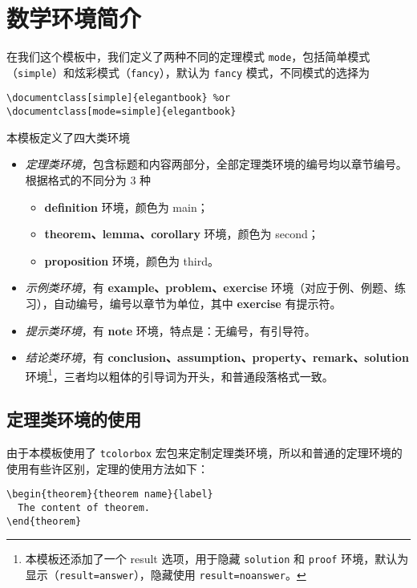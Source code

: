\documentclass[cn,10pt,math=newtx,citestyle=gb7714-2015,bibstyle=gb7714-2015]{elegantbook}
\begin{document}
\section{数学环境简介}

在我们这个模板中，我们定义了两种不同的定理模式 \lstinline{mode}，包括简单模式（\lstinline{simple}）和炫彩模式（\lstinline{fancy}），默认为 \lstinline{fancy} 模式，不同模式的选择为
\begin{lstlisting}
\documentclass[simple]{elegantbook} %or
\documentclass[mode=simple]{elegantbook}
\end{lstlisting}

本模板定义了四大类环境

\begin{itemize}
  \item \textit{定理类环境}，包含标题和内容两部分，全部定理类环境的编号均以章节编号。根据格式的不同分为 3 种
    \begin{itemize}
      \item \textcolor{main}{\textbf{definition}} 环境，颜色为 \textcolor{main}{main}；
      \item \textcolor{second}{\textbf{theorem、lemma、corollary}} 环境，颜色为 \textcolor{second} {second}；
      \item \textcolor{third}{\textbf{proposition}} 环境，颜色为 \textcolor{third}{third}。
    \end{itemize}
  \item \textit{示例类环境}，有 \textbf{example、problem、exercise} 环境（对应于例、例题、练习），自动编号，编号以章节为单位，其中 \textbf{exercise} 有提示符。
  \item \textit{提示类环境}，有 \textbf{note} 环境，特点是：无编号，有引导符。
  \item \textit{结论类环境}，有 \textbf{conclusion、assumption、property、remark、solution} 环境\footnote{本模板还添加了一个 result 选项，用于隐藏 \lstinline{solution} 和 \lstinline{proof} 环境，默认为显示（\lstinline{result=answer}），隐藏使用 \lstinline{result=noanswer}。}，三者均以粗体的引导词为开头，和普通段落格式一致。
\end{itemize}

\subsection{定理类环境的使用}

由于本模板使用了 \lstinline{tcolorbox} 宏包来定制定理类环境，所以和普通的定理环境的使用有些许区别，定理的使用方法如下：
\begin{lstlisting}
\begin{theorem}{theorem name}{label}
  The content of theorem.
\end{theorem}
\end{lstlisting}
\end{document}
